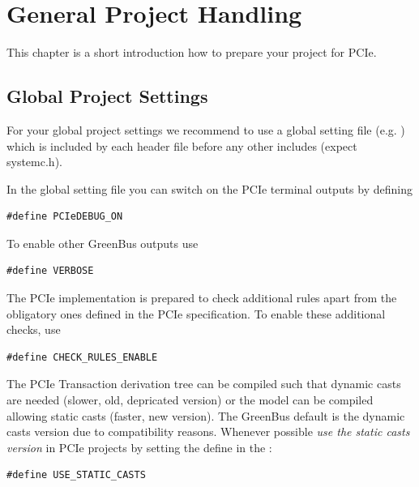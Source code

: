 
\chapter{General Project Handling}
\label{sec:GeneralProjectHandling}

This chapter is a short introduction how to prepare your project for PCIe.


\section{Global Project Settings}

For your global project settings we recommend to use a global setting file (e.g. ) which is included by each header file before any other includes (expect systemc.h).


In the global setting file you can switch on the PCIe terminal outputs by defining
\begin{lstlisting}
#define PCIeDEBUG_ON
\end{lstlisting}

To enable other GreenBus outputs use 
\begin{lstlisting}
#define VERBOSE
\end{lstlisting}



The PCIe implementation is prepared to check additional rules apart from the obligatory ones defined in the PCIe specification. To enable these additional checks, use
\begin{lstlisting}
#define CHECK_RULES_ENABLE
\end{lstlisting}


The PCIe Transaction derivation tree can be compiled such that dynamic casts are needed (slower, old, depricated version) or the model can be compiled allowing static casts (faster, new version). The GreenBus default is the dynamic casts version due to compatibility reasons. Whenever possible \emph{use the static casts version} in PCIe projects by setting the define in the :
\begin{lstlisting}
#define USE_STATIC_CASTS
\end{lstlisting}

